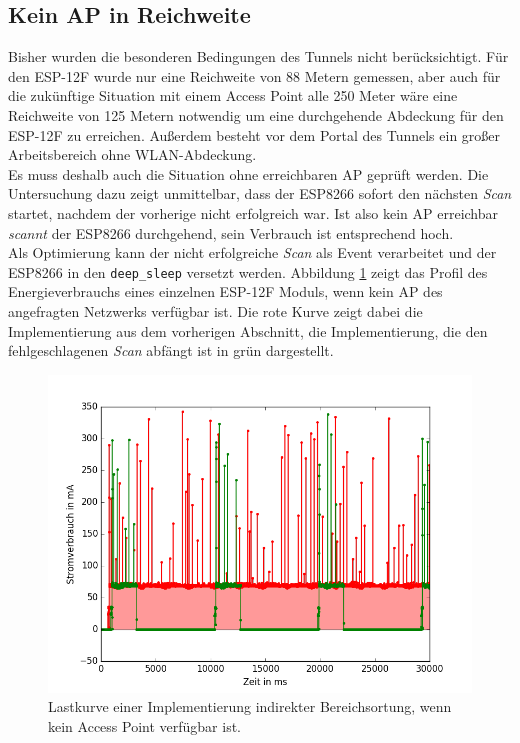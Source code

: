 \subsection{Kein AP in Reichweite}
Bisher wurden die besonderen Bedingungen des Tunnels nicht berücksichtigt.
Für den ESP-12F wurde nur eine Reichweite von 88 Metern gemessen, aber auch für die zukünftige Situation mit einem Access Point alle 250 Meter wäre eine Reichweite von 125 Metern notwendig um eine durchgehende Abdeckung für den ESP-12F zu erreichen.
Außerdem besteht vor dem Portal des Tunnels ein großer Arbeitsbereich ohne WLAN-Abdeckung.\\
Es muss deshalb auch die Situation ohne erreichbaren AP geprüft werden.
Die Untersuchung dazu zeigt unmittelbar, dass der ESP8266 sofort den nächsten \emph{Scan} startet, nachdem der vorherige nicht erfolgreich war.
Ist also kein AP erreichbar \emph{scannt} der ESP8266 durchgehend, sein Verbrauch ist entsprechend hoch.\\
Als Optimierung kann der nicht erfolgreiche \emph{Scan} als Event verarbeitet und der ESP8266 in den \texttt{deep\_sleep} versetzt werden.
Abbildung \ref{fig:noap} zeigt das Profil des Energieverbrauchs eines einzelnen ESP-12F Moduls, wenn kein AP des angefragten Netzwerks verfügbar ist.
Die rote Kurve zeigt dabei die Implementierung aus dem vorherigen Abschnitt, die Implementierung, die den fehlgeschlagenen \emph{Scan} abfängt ist in grün dargestellt.

\begin{figure}[h!]
  \centering
	\includegraphics[width=\textwidth]{plots/noap.png}
  \caption{Lastkurve einer Implementierung indirekter Bereichsortung, wenn kein Access Point verfügbar ist.}
  \label{fig:noap}
\end{figure}


